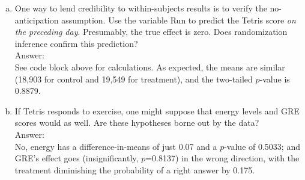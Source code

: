 \documentclass[11pt,notitlepage]{article}\usepackage[]{graphicx}\usepackage[]{color}
\makeatletter
\newenvironment{kframe}{%
 \def\at@end@of@kframe{}%
 \ifinner\ifhmode%
  \def\at@end@of@kframe{\end{minipage}}%
  \begin{minipage}{\columnwidth}%
 \fi\fi%
 \def\FrameCommand##1{\hskip\@totalleftmargin \hskip-\fboxsep
 \colorbox{shadecolor}{##1}\hskip-\fboxsep
     \hskip-\linewidth \hskip-\@totalleftmargin \hskip\columnwidth}%
 \MakeFramed {\advance\hsize-\width
   \@totalleftmargin\z@ \linewidth\hsize
   \@setminipage}}%
 {\par\unskip\endMakeFramed%
 \at@end@of@kframe}
\newenvironment{knitrout}{}{} %
\makeatother
\begin{document}
\begin{enumerate}[a)]
\begin{knitrout}
\begin{kframe}
\begin{Verbatim}[commandchars=\\\{\}]
         \PY{c+c1}{//}\PY{c+c1}{ }\PY{c+c1}{o}\PY{c+c1}{n}\PY{c+c1}{e}\PY{c+c1}{\PYZhy{}}\PY{c+c1}{t}\PY{c+c1}{a}\PY{c+c1}{i}\PY{c+c1}{l}\PY{c+c1}{e}\PY{c+c1}{d}\PY{c+c1}{ }\PY{c+c1}{p}\PY{c+c1}{\PYZhy{}}\PY{c+c1}{v}\PY{c+c1}{a}\PY{c+c1}{l}\PY{c+c1}{u}\PY{c+c1}{e}\PY{c+c1}{:}\PY{c+c1}{ }\PY{c+c1}{d}\PY{c+c1}{o}\PY{c+c1}{e}\PY{c+c1}{s}\PY{c+c1}{ }\PY{c+c1}{r}\PY{c+c1}{u}\PY{c+c1}{n}\PY{c+c1}{n}\PY{c+c1}{i}\PY{c+c1}{n}\PY{c+c1}{g}\PY{c+c1}{ }\PY{c+c1}{i}\PY{c+c1}{m}\PY{c+c1}{p}\PY{c+c1}{r}\PY{c+c1}{o}\PY{c+c1}{v}\PY{c+c1}{e}\PY{c+c1}{ }\PY{c+c1}{G}\PY{c+c1}{R}\PY{c+c1}{E}
         \PY{c+c1}{//}\PY{c+c1}{ }\PY{c+c1}{m}\PY{c+c1}{e}\PY{c+c1}{a}\PY{c+c1}{n}\PY{c+c1}{(}\PY{c+c1}{d}\PY{c+c1}{i}\PY{c+c1}{s}\PY{c+c1}{t}\PY{c+c1}{5}\PY{c+c1}{ }\PY{c+c1}{\PYZgt{}}\PY{c+c1}{=}\PY{c+c1}{ }\PY{c+c1}{f}\PY{c+c1}{i}\PY{c+c1}{t}\PY{c+c1}{5}\PY{c+c1}{)}\PY{c+c1}{ }
         \PY{k}{disp} \PY{n+nf}{r}(N)\PY{o}{/}\PYZus{}N
         \PY{k}{restore}
\end{Verbatim}

    \begin{Verbatim}[commandchars=\\\{\}]
.8137
    \end{Verbatim}
\end{kframe}
\end{knitrout}

Focusing solely on the immediate effect of running that day's tetris scores, we see that on non-running days the average tetris score is 12,806, as compared to 26,419 on running days, for a difference of 13,613. Randomization inference indicates that this observed difference has a one-tailed $p$-value of 0.004. Using the F-statistic to assess the joint significance of immediate and one-period lagged effects, we obtain a $p$-value of 0.0146, again allowing us to reject the null hypothesis of no effect.

\item One way to lend credibility to within-subjects results is to verify the no-anticipation assumption. Use the variable Run to predict the Tetris score \textit{on the preceding day}. Presumably, the true effect is zero. Does randomization inference confirm this prediction? \\
Answer:\\
See code block above for calculations. As expected, the means are similar (18,903 for control and 19,549 for treatment), and the two-tailed $p$-value is 0.8879.

\item If Tetris responds to exercise, one might suppose that energy levels and GRE scores would as well. Are these hypotheses borne out by the data?\\
Answer:\\
No, energy has a difference-in-means of just 0.07 and a $p$-value of 0.5033; and GRE's effect goes (insignificantly, $p$=0.8137) in the wrong direction, with the treatment diminishing the probability of a right answer by 0.175.
\end{enumerate}
\end{document}
